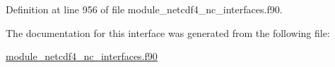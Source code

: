Definition at line 956 of file module\+\_\+netcdf4\+\_\+nc\+\_\+interfaces.\+f90.



The documentation for this interface was generated from the following file\+:\begin{DoxyCompactItemize}
\item 
\hyperlink{module__netcdf4__nc__interfaces_8f90}{module\+\_\+netcdf4\+\_\+nc\+\_\+interfaces.\+f90}\end{DoxyCompactItemize}
